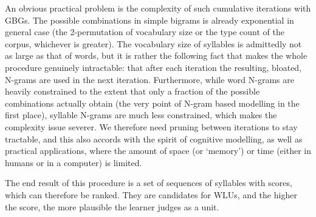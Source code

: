 \documentclass[a4]{article}
\begin{document}
\begin{algorithm}[h]

\\{\smaller where Units1 is an n-tuple of base units, Unit2 a single base unit and Occ the occurrences of (Units1,Unit2)}\\
\smallskip
initialisation;\\
GBGsWithCount$\leftarrow $ BigramWithCount\\
GBGsWithAM$\leftarrow [\hspace{0.2mm}]$\\
 \endFor
 }\endWhile
 \caption{Generalising bigrams to N-grams with filtering}
\label{peudocode}
\end{algorithm}


An obvious practical problem is the complexity of such cumulative iterations with GBGs. The possible combinations in simple bigrams is already exponential in general case (the 2-permutation of vocabulary size or the type count of the corpus, whichever is greater). The vocabulary size of syllables is admittedly not as large as that of words, but it is rather the following fact that makes the whole procedure genuinely intractable: that after each iteration the resulting, bloated, N-grams are used in the next iteration. Furthermore, while word N-grams are heavily constrained to the extent that only a fraction of the possible combinations actually obtain (the very point of N-gram based modelling in the first place), syllable N-grams are much less constrained, which makes the complexity issue severer.  We therefore need pruning between iterations to stay tractable, and this also accords with the spirit of cognitive modelling, as well as practical applications, where the amount of space (or `memory') or time (either in humans or in a computer) is limited.

The end result of this procedure is a set of sequences of syllables with scores, which can therefore be ranked. They are candidates for WLUs, and the higher the score, the more plausible the learner judges as a unit. 
\end{document}
